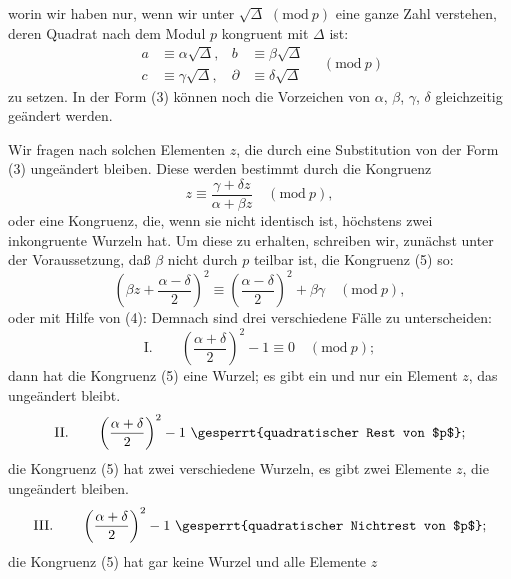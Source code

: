 worin
wir haben nur, wenn wir unter $\sqrt{\varDelta}$ $(\mathrm{mod}\ p)$ eine ganze
Zahl verstehen, deren Quadrat nach dem Modul $p$ kongruent
mit $\varDelta$ ist:
\[
\begin{aligned}
a &\equiv \alpha\sqrt{\varDelta}, & b &\equiv \beta\sqrt{\varDelta}\\
c &\equiv \gamma\sqrt{\varDelta}, & \partial &\equiv \delta\sqrt{\varDelta}
\end{aligned}
\quad (\mathrm{mod}\ p)
\]
zu setzen. In der Form (3) können noch die Vorzeichen von
$\alpha$, $\beta$, $\gamma$, $\delta$ gleichzeitig geändert werden.

Wir fragen nach solchen Elementen $z$, die durch eine Substitution
 von der Form (3) ungeändert bleiben. Diese werden
bestimmt durch die Kongruenz
\[
z \equiv \frac{\gamma+\delta z}{\alpha+\beta z} \quad (\mathrm{mod}\ p),
\]
oder
eine Kongruenz, die, wenn sie nicht identisch ist, höchstens zwei
inkongruente Wurzeln hat. Um diese zu erhalten, schreiben wir,
zunächst unter der Voraussetzung, daß $\beta$ nicht durch $p$ teilbar
ist, die Kongruenz (5) so:
\[
\left(\beta z + \frac{\alpha-\delta}{2}\right)^2 \equiv \left(\frac{\alpha-\delta}{2}\right)^2 + \beta\gamma \quad (\mathrm{mod}\ p),
\]
oder mit Hilfe von (4):
Demnach sind drei verschiedene Fälle zu unterscheiden:
\[
\mathrm{I.} \qquad \left(\frac{\alpha+\delta}{2}\right)^2 - 1 \equiv 0 \quad (\mathrm{mod}\ p);
\]
dann hat die Kongruenz (5) eine Wurzel; es gibt ein und
nur ein Element $z$, das ungeändert bleibt.
\[
\mathrm{II.} \qquad \left(\frac{\alpha+\delta}{2}\right)^2 - 1 \ \text{\gesperrt{quadratischer Rest von $p$}};
\]
die Kongruenz (5) hat zwei verschiedene Wurzeln, es gibt zwei
Elemente $z$, die ungeändert bleiben.
\[
\mathrm{III.} \qquad \left(\frac{\alpha+\delta}{2}\right)^2 - 1 \ \text{\gesperrt{quadratischer Nichtrest von $p$}};
\]
die Kongruenz (5) hat gar keine Wurzel und alle Elemente $z$
